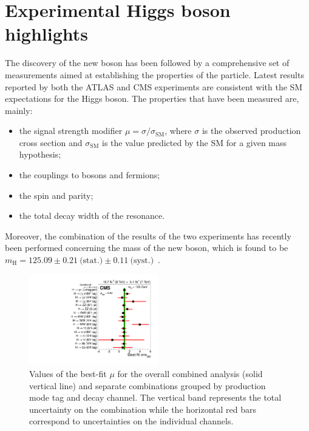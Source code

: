 \section{Experimental Higgs boson highlights}
\label{sec:HiggsExp}

The discovery of the new boson has been followed by a comprehensive set of measurements aimed at establishing the properties of the particle. Latest results reported by both the ATLAS and CMS experiments are consistent with the SM expectations for the Higgs boson. The properties that have been measured are, mainly:

\begin{itemize}
\item the signal strength modifier $\mu = \sigma/\sigma_\mathrm{SM}$, where $\sigma$ is the observed production cross section and $\sigma_\mathrm{SM}$ is the value predicted by the SM for a given mass hypothesis;

\item the couplings to bosons and fermions;

\item the spin and parity;

\item the total decay width of the resonance.
\end{itemize}

Moreover, the combination of the results of the two experiments has recently been performed concerning the mass of the new boson, which is found to be $m_\mathrm{H} = 125.09 \pm 0.21 ~\text{(stat.)} \pm 0.11~\text{(syst.)}$\GeV~\cite{Aad:2015zhl}.

\begin{figure}[htb]
\centering
\includegraphics[width=0.5\textwidth]{images/signal_strengths.pdf}
\caption{Values of the best-fit $\mu$ for the overall combined analysis (solid vertical line) and separate combinations grouped by production mode tag and decay channel. The vertical band represents the total uncertainty on the combination while the horizontal red bars correspond to uncertainties on the individual channels.}\label{fig:signal_strengths}
\end{figure}

